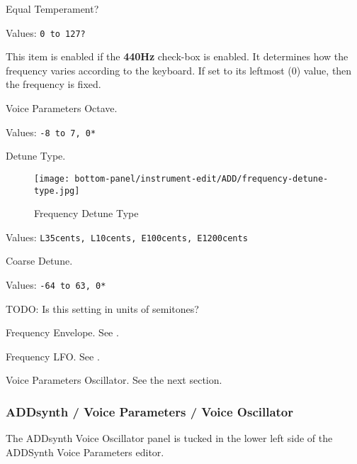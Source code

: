    Equal Temperament?

   Values: \texttt{0 to 127?}

   This item is enabled if the \textbf{440Hz} check-box is enabled.
   It determines how the frequency varies according to the 
   keyboard.  If set to its leftmost (0) value, then the frequency is fixed.

   Voice Parameters Octave.

   Values: \texttt{-8 to 7, 0*}

%

   Detune Type.

\begin{figure}[H]
   \centering 
   \texttt{[image: bottom-panel/instrument-edit/ADD/frequency-detune-type.jpg]}
   \caption{Frequency Detune Type}
   \label{fig:frequency_detune_tYpe}
\end{figure}

   Values: \texttt{L35cents, L10cents, E100cents, E1200cents}

   Coarse Detune.

   Values: \texttt{-64 to 63, 0*}

   TODO: Is this setting in units of semitones?

   Frequency Envelope.
   See .

   Frequency LFO.
   See .

   Voice Parameters Oscillator.
   See the next section.

\subsubsection{ADDsynth / Voice Parameters / Voice Oscillator}
\label{subsubsec:addsynth_voice_parameters_oscillator}

   The ADDsynth Voice Oscillator panel is tucked in the lower left side of the
   ADDSynth Voice Parameters editor.

